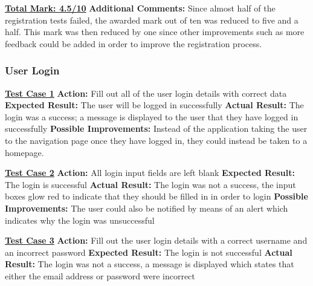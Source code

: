 \documentclass[english]{article}
\begin{document}
\textbf{\underline{Total Mark: 4.5/10}}\newline
\textbf{Additional Comments:} Since almost half of the registration tests failed, the awarded mark out of ten was reduced to five and a half. This mark was then reduced by one since other improvements such as more feedback could be added in order to improve the registration process. \newline

\subsubsection{User Login}
\textbf{\underline{Test Case 1}}\newline
\textbf{Action:} Fill out all of the user login details with correct data\newline
\textbf{Expected Result:} The user will be logged in successfully\newline
\textbf{Actual Result:} The login was a success; a message is displayed to the user that they have logged in successfully\newline
\textbf{Possible Improvements:} Instead of the application taking the user to the navigation page once they have logged in, they could instead be taken to a homepage. \newline

\textbf{\underline{Test Case 2}}\newline
\textbf{Action:} All login input fields are left blank\newline
\textbf{Expected Result:} The login is successful\newline
\textbf{Actual Result:} The login was not a success, the input boxes glow red to indicate that they should be filled in in order to login\newline
\textbf{Possible Improvements:} The user could also be notified by means of an alert which indicates why the login was unsuccessful\newline

\textbf{\underline{Test Case 3}}\newline
\textbf{Action:} Fill out the user login details with a correct username and an incorrect password\newline
\textbf{Expected Result:} The login is not successful\newline
\textbf{Actual Result:} The login was not a success, a message is displayed which states that either the email address or password were incorrect\newline
\end{document}
